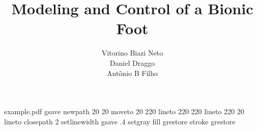 %
%
%
%
%
\begin{filecontents*}{example.pdf}
	gsave
	newpath
	20 20 moveto
	20 220 lineto
	220 220 lineto
	220 20 lineto
	closepath
	2 setlinewidth
	gsave
	.4 setgray fill
	grestore
	stroke
	grestore
\end{filecontents*}
%
\RequirePackage{fix-cm}
%
\documentclass[smallextended]{svjour3}       %
%
\smartqed  %
%
\usepackage{graphicx}
\usepackage{xcolor}
%
%
%
%
%

	
	\title{Modeling and Control of a Bionic Foot%
	}
	
	
	\author{Vitorino Biazi Neto\\ Daniel Draggo\\ Ant\^onio B Filho %
	}
	
	
